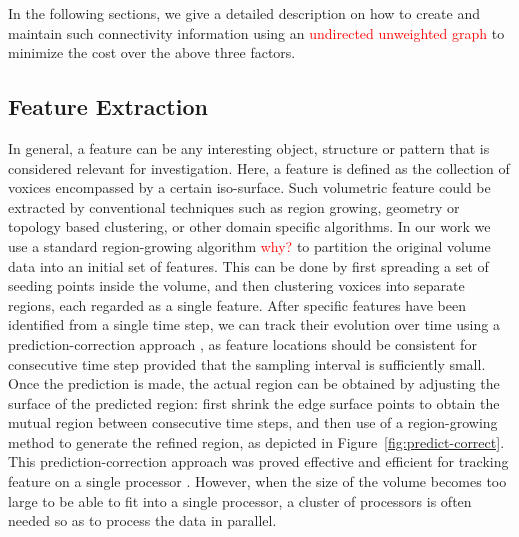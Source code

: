 \documentclass[10pt, conference, compsocconf]{IEEEtran}
\begin{document}
In the following sections, we give a detailed description on how to create and maintain such connectivity information using an \textcolor{red}{undirected unweighted graph} to minimize the cost over the above three factors.

\subsection{Feature Extraction}

In general, a feature can be any interesting object, structure or pattern that is considered relevant for investigation. Here, a feature is defined as the collection of voxices encompassed by a certain iso-surface. Such volumetric feature could be extracted by conventional techniques such as region growing, geometry or topology based clustering, or other domain specific algorithms. In our work we use a standard region-growing algorithm \textcolor{red}{why?} \cite{Huang2003} to partition the original volume data into an initial set of features. This can be done by first spreading a set of seeding points inside the volume, and then clustering voxices into separate regions, each regarded as a single feature. After specific features have been identified from a single time step, we can track their evolution over time using a prediction-correction approach \cite{Muelder2009}, as feature locations should be consistent for consecutive time step provided that the sampling interval is sufficiently small. Once the prediction is made, the actual region can be obtained by adjusting the surface of the predicted region: first shrink the edge surface points to obtain the mutual region between consecutive time steps, and then use of a region-growing method to generate the refined region, as depicted in Figure~\ref{fig:predict-correct}. This prediction-correction approach was proved effective and efficient for tracking feature on a single processor \cite{Muelder2009}. However, when the size of the volume becomes too large to be able to fit into a single processor, a cluster of processors is often needed so as to process the data in parallel. 
\end{document}
